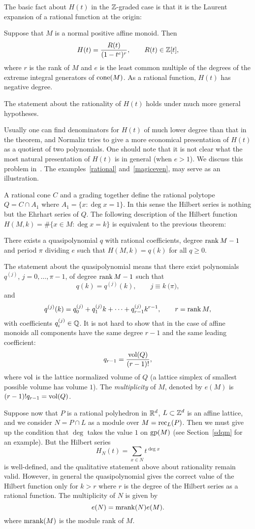 The basic fact about $H(t)$ in the ${\mathbb Z}$-graded case is that it
is the Laurent expansion of a rational function at the origin:
\begin{theorem}
	Suppose that $M$ is a normal positive affine monoid. Then
	$$
	H(t)=\frac{R(t)}{(1-t^e)^r},\qquad R(t)\in\ZZ[t], %
	$$
	where $r$ is the rank of $M$ and $e$ is the least common multiple
	of the degrees of the extreme integral generators of $\operatorname{cone}(M)$. As a rational function, $H(t)$ has negative degree.
\end{theorem}

The statement about the rationality of $H(t)$ holds under much more general hypotheses.

Usually one can find denominators for $H(t)$ of much lower
degree than that in the theorem, and Normaliz tries to
give a more economical presentation of $H(t)$ as a quotient of
two polynomials. One should note that it is not clear what the
most natural presentation of $H(t)$ is in general (when $e>1$).
We discuss this problem in~\cite[Section~4]{BIS}. The examples~\ref{rational} and~\ref{magiceven}, may serve as
an illustration.

A rational cone $C$ and a grading together define the rational
polytope $Q=C\cap A_1$ where $A_1=\{x:\deg x=1\}$. In this
sense the Hilbert series is nothing but the Ehrhart series of
$Q$.
The following description of the Hilbert function $H(M,k)=\#\{x\in M: \deg x=k\}$ is equivalent to the previous theorem:

\begin{theorem}
	There exists a quasipolynomial $q$ with rational coefficients, degree $\operatorname{rank} M-1$ and period $\pi$ dividing $e$ such that $H(M,k)=q(k)$ for all $q\ge0$.
\end{theorem}

The statement about the quasipolynomial means that there exist
polynomials $q^{(j)}$, $j=0,\dots,\pi-1$, of degree $\operatorname{rank} M-1$ such that
$$
q(k)=q^{(j)}(k),\qquad j\equiv k\pod \pi,
$$
and
$$
q^{(j)}(k)=q^{(j)}_0+q^{(j)}_1k+\dots+q^{(j)}_{r-1}k^{r-1},\qquad r=\operatorname{rank} M,
$$
with coefficients $q^{(j)}_i\in {\mathbb Q}$. It is not hard to show that in the case of affine monoids all components have the same degree $r-1$ and the same leading coefficient:
$$
q_{r-1}=\frac{\operatorname{vol}(Q)}{(r-1)!},
$$
where $\operatorname{vol}$ is the lattice normalized volume of $Q$ (a lattice simplex of smallest possible volume has volume $1$). The \emph{multiplicity} of $M$, denoted by $e(M)$ is $(r-1)!q_{r-1}=\operatorname{vol}(Q)$.

Suppose now that $P$ is a rational polyhedron in ${\mathbb R}^d$, $L\subset{\mathbb Z}^d$ is an affine lattice, and we consider $N=P\cap L$ as a module over $M=\operatorname{rec}_L(P)$. Then we must give up the condition that $\deg$ takes the value $1$ on $\operatorname{gp}(M)$ (see Section~\ref{sdqm} for an example). But the Hilbert series
$$
H_N(t)=\sum_{x\in N} t^{\deg x}
$$
is well-defined, and the qualitative statement above about rationality remain valid. However, in general the quasipolynomial gives the correct value of the Hilbert function only for $k>r$ where $r$ is the degree of the Hilbert series as a rational function. The multiplicity of $N$ is given by
$$
e(N)=\operatorname{mrank}(N)e(M).
$$
where $\operatorname{mrank}(M)$ is the module rank of $M$.

